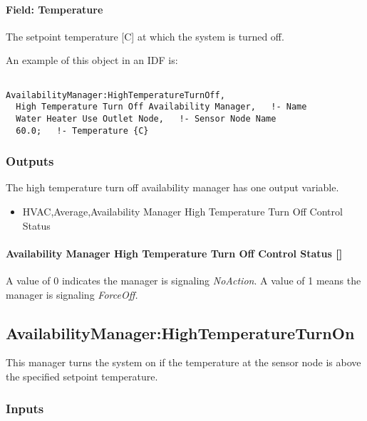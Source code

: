\paragraph{Field: Temperature}\label{field-temperature}

The setpoint temperature {[}C{]} at which the system is turned off.

An example of this object in an IDF is:

\begin{lstlisting}

AvailabilityManager:HighTemperatureTurnOff,
  High Temperature Turn Off Availability Manager,   !- Name
  Water Heater Use Outlet Node,   !- Sensor Node Name
  60.0;   !- Temperature {C}
\end{lstlisting}

\subsubsection{Outputs}\label{outputs-4-017}

The high temperature turn off availability manager has one output variable.

\begin{itemize}
\tightlist
\item
  HVAC,Average,Availability Manager High Temperature Turn Off Control Status
\end{itemize}

\paragraph{Availability Manager High Temperature Turn Off Control Status {[]}}\label{availability-manager-high-temperature-turn-off-control-status}

A value of 0 indicates the manager is signaling \emph{NoAction}. A value of 1 means the manager is signaling \emph{ForceOff.}

\subsection{AvailabilityManager:HighTemperatureTurnOn}\label{availabilitymanagerhightemperatureturnon}

This manager turns the system on if the temperature at the sensor node is above the specified setpoint temperature.

\subsubsection{Inputs}\label{inputs-6-028}

